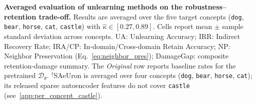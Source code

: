 \begin{table}[t]
\caption{\textbf{Averaged evaluation of unlearning methods on the robustness--retention trade-off.} Results are averaged over the five target concepts (\texttt{dog}, \texttt{bear}, \texttt{horse}, \texttt{cat}, \texttt{castle}) with $\hat\kappa \in [{0.27}, {0.89}]$. Cells report mean $\pm$ sample standard deviation across concepts. UA: Unlearning Accuracy; IRR: Indirect Recovery Rate; IRA/CP: In-domain/Cross-domain Retain Accuracy; NP: Neighbor Preservation (Eq.~\eqref{eq:neighbor_pres}); DamageGap: composite retention-damage summary. The \emph{Original} row reports baseline rates for the pretrained $\mathcal{D}_\theta$. $^\dagger$SAeUron is averaged over four concepts (\texttt{dog}, \texttt{bear}, \texttt{horse}, \texttt{cat}); its released sparse autoencoder features do not cover \texttt{castle} (see~\cref{app:per_concept_castle}).}
\label{tab:main_results_avg}
\end{table}

